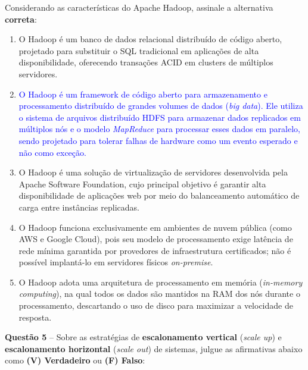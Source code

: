 \documentclass[12pt,a4paper]{article}
\begin{document}
\vspace{0.2cm}

Considerando as características do Apache Hadoop, assinale a alternativa \textbf{correta}:

\vspace{0.3cm}

\begin{enumerate}[label=\textbf{(\Alph*)}]
    \item O Hadoop é um banco de dados relacional distribuído de código aberto, projetado para substituir o SQL tradicional em aplicações de alta disponibilidade, oferecendo transações ACID em clusters de múltiplos servidores.

    \item[\textcolor{blue}{\textbf{(B)}}] \textcolor{blue}{O Hadoop é um framework de código aberto para armazenamento e processamento distribuído de grandes volumes de dados (\textit{big data}). Ele utiliza o sistema de arquivos distribuído HDFS para armazenar dados replicados em múltiplos nós e o modelo \textit{MapReduce} para processar esses dados em paralelo, sendo projetado para tolerar falhas de hardware como um evento esperado e não como exceção.}

    \item O Hadoop é uma solução de virtualização de servidores desenvolvida pela Apache Software Foundation, cujo principal objetivo é garantir alta disponibilidade de aplicações web por meio do balanceamento automático de carga entre instâncias replicadas.

    \item O Hadoop funciona exclusivamente em ambientes de nuvem pública (como AWS e Google Cloud), pois seu modelo de processamento exige latência de rede mínima garantida por provedores de infraestrutura certificados; não é possível implantá-lo em servidores físicos \textit{on-premise}.

    \item O Hadoop adota uma arquitetura de processamento em memória (\textit{in-memory computing}), na qual todos os dados são mantidos na RAM dos nós durante o processamento, descartando o uso de disco para maximizar a velocidade de resposta.
\end{enumerate}

\vspace{0.5cm}

\textbf{Questão 5} -- Sobre as estratégias de \textbf{escalonamento vertical} (\textit{scale up}) e \textbf{escalonamento horizontal} (\textit{scale out}) de sistemas, julgue as afirmativas abaixo como \textbf{(V) Verdadeiro} ou \textbf{(F) Falso}:
\end{document}
